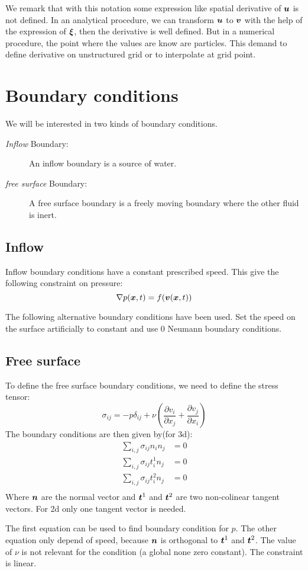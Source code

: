 \begin{remark}
We remark that with this notation some expression like spatial derivative of ${\boldsymbol {u}}$ is not defined.
In an analytical procedure, we can transform ${\boldsymbol {u}}$ to ${\boldsymbol {v}}$ with the help of the expression of ${\boldsymbol {\xi}}$, then the derivative is well defined.
But in a numerical procedure, the point where the values are know are particles. This demand to define derivative on unstructured grid
or to interpolate at grid point.
\end{remark}

\section{Boundary conditions}

We will be interested in two kinds of boundary conditions.
\begin{description}
 \item[\emph{Inflow} Boundary:]
 An inflow boundary is a source of water.
 \item[\emph{free surface} Boundary:]
 A free surface boundary is a freely moving boundary where the other fluid is inert.
\end{description}

\subsection{Inflow}

Inflow boundary conditions have a constant prescribed speed.
This give the following constraint on pressure:
\begin{equation}
\nabla p({\boldsymbol {x}},t)=f({\boldsymbol {v}}({\boldsymbol {x}},t))
\end{equation}

The following alternative boundary conditions have been used.
Set the speed on the surface artificially to constant and use 0 Neumann boundary conditions.


\subsection{Free surface}
\label{ana:free:surface}
To define the free surface boundary conditions, we need to define the stress tensor:
\begin{equation}
	\sigma_{ij}=-p \delta_{ij}+\nu\left(\frac{\partial v_{i}}{\partial x_{j}}+\frac{\partial v_{j}}{\partial x_{i}}\right)
\end{equation}
The boundary conditions are then given by(for 3d):
\begin{align}
	\sum_{i,j}\sigma_{ij}n_{i}n_{j}&=0\\
	\sum_{i,j}\sigma_{ij}t^{1}_{i}n_{j}&=0\\
	\sum_{i,j}\sigma_{ij}t^{2}_{i}n_{j}&=0\\
\end{align}
Where ${\boldsymbol {n}}$ are the normal vector and ${\boldsymbol {t}}^1$ and ${\boldsymbol {t}}^2$ are two non-colinear tangent vectors.
For 2d only one tangent vector is needed.

The first equation can be used to find boundary condition for $p$.
The other equation only depend of speed, because ${\boldsymbol {n}}$ is orthogonal to ${\boldsymbol {t}}^{1}$ and ${\boldsymbol {t}}^{2}$.
The value of $\nu$ is not relevant for the condition (a global none zero constant).
The constraint is linear.